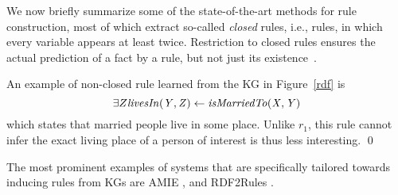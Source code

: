 We now briefly summarize some of the state-of-the-art methods %
for rule construction, most of which %
extract so-called \emph{closed} rules,
i.e., rules, in which every variable appears at least twice. Restriction to closed rules %
ensures the actual prediction  of a fact by a rule, but not just its existence~\cite{amie}.

\begin{example}
An example of non-closed rule learned from the KG in Figure~\ref{rdf} is %
\[\exists Z \mathit{livesIn(Y,Z)} \leftarrow \mathit{isMarriedTo(X,Y)} \]  which states that married people 
live in some place. Unlike $r_1$, this rule cannot infer the exact living place of a person of interest is thus less interesting. \qed%
\end{example}

The most prominent examples of systems that are specifically tailored towards inducing rules from KGs are AMIE \cite{amie}, %
and RDF2Rules \cite{rdf2rules}.
